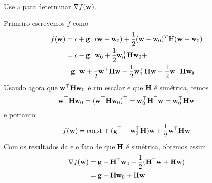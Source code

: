 \begin{exenumerate}
    \item Use a  para determinar $\nabla f(\mathbf{w})$.
    
    \begin{solution}
        Primeiro escrevemos $f$ como
        \begin{align}
            f(\mathbf{w}) &= c + \mathbf{g}^\top(\mathbf{w}-\mathbf{w}_0)+\frac{1}{2}(\mathbf{w}-\mathbf{w}_0)^T\mathbf{H}(\mathbf{w}-\mathbf{w}_0) \\
            &= c - \mathbf{g}^\top \mathbf{w}_0 + \frac{1}{2} \mathbf{w}_0^\top\mathbf{H} \mathbf{w}_0 + \nonumber \\
            &\phantom{=} \mathbf{g}^\top \mathbf{w} + \frac{1}{2}\mathbf{w}^\top\mathbf{H}\mathbf{w} - \frac{1}{2} \mathbf{w}_0^\top \mathbf{H} \mathbf{w} - \frac{1}{2} \mathbf{w}^\top \mathbf{H} \mathbf{w}_0
        \end{align}
        Usando agora que $\mathbf{w}^\top \mathbf{H} \mathbf{w}_0$ \'e um escalar e que $\mathbf{H}$ \'e sim\'etrica, temos
        \begin{equation}
            \mathbf{w}^\top \mathbf{H} \mathbf{w}_0= (\mathbf{w}^\top \mathbf{H} \mathbf{w}_0)^\top = \mathbf{w}_0^\top \mathbf{H}^\top \mathbf{w} = \mathbf{w}_0^\top \mathbf{H} \mathbf{w}
        \end{equation}
        e portanto
        \begin{equation}
            f(\mathbf{w}) = \text{const} + (\mathbf{g}^\top - \mathbf{w}_0^\top \mathbf{H}) \mathbf{w} +  \frac{1}{2}\mathbf{w}^\top\mathbf{H}\mathbf{w}
        \end{equation}
        Com os resultados da  e o fato de que $\mathbf{H}$ \'e sim\'etrica, obtemos assim
        \begin{align}
            \nabla f(\mathbf{w}) &= \mathbf{g}-\mathbf{H}^\top \mathbf{w}_0 + \frac{1}{2}(\mathbf{H}^\top\mathbf{w} + \mathbf{H}\mathbf{w}) \\
            & = \mathbf{g}-\mathbf{H} \mathbf{w}_0 + \mathbf{H}\mathbf{w}
        \end{align}
        

\end{solution}
\end{exenumerate}
